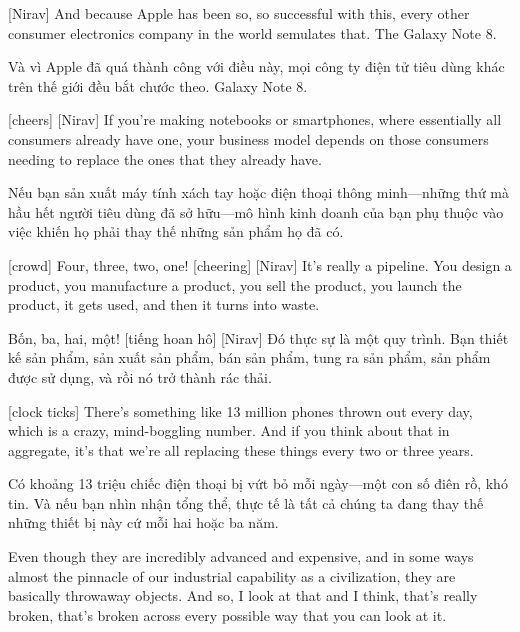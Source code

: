 \documentclass[a4paper]{article}
\begin{document}
	[Nirav] And because Apple has been so, so successful with this, every other consumer electronics company in the world semulates that.
	The Galaxy Note 8.
	
	\begin{vietnamese-v2}
		[Nirav] Và vì Apple đã quá thành công với điều này, mọi công ty điện tử tiêu dùng khác trên thế giới đều bắt chước theo.  
		Galaxy Note 8.
	\end{vietnamese-v2}
	
	
	[cheers]
	[Nirav] If you're making notebooks or smartphones, where essentially all consumers already have one, your business model depends on those consumers needing to replace the ones that they already have.
	
	\begin{vietnamese-v2}
		 Nếu bạn sản xuất máy tính xách tay hoặc điện thoại thông minh—những thứ mà hầu hết người tiêu dùng đã sở hữu—mô hình kinh doanh của bạn phụ thuộc vào việc khiến họ phải thay thế những sản phẩm họ đã có.
	\end{vietnamese-v2}
	
	[crowd] Four, three, two, one!
	[cheering]
	[Nirav] It's really a pipeline. You design a product, you manufacture a product, you sell the product, you launch the product, it gets used, and then it turns into waste.
	
	\begin{vietnamese-v2}
		 Bốn, ba, hai, một! [tiếng hoan hô] [Nirav] Đó thực sự là một quy trình. Bạn thiết kế sản phẩm, sản xuất sản phẩm, bán sản phẩm, tung ra sản phẩm, sản phẩm được sử dụng, và rồi nó trở thành rác thải.
	\end{vietnamese-v2}
	
	[clock ticks]
	There's something like 13 million phones thrown out every day, which is a crazy, mind-boggling number. And if you think about that in aggregate, it's that we're all replacing these things every two or three years.
	
	\begin{vietnamese-v2}
		 Có khoảng 13 triệu chiếc điện thoại bị vứt bỏ mỗi ngày—một con số điên rồ, khó tin. Và nếu bạn nhìn nhận tổng thể, thực tế là tất cả chúng ta đang thay thế những thiết bị này cứ mỗi hai hoặc ba năm.
	\end{vietnamese-v2}
	
	Even though they are incredibly advanced and expensive, and in some ways almost the pinnacle of our industrial capability as a civilization, they are basically throwaway objects.
	And so, I look at that and I think, that's really broken, that's broken across every possible way that you can look at it.
	
\end{document}
